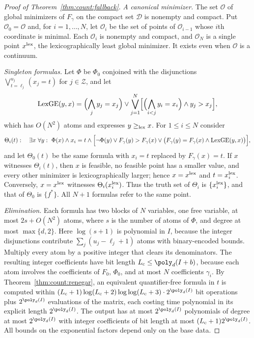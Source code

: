 \begin{proof}[Proof of Theorem~\ref{thm:count:fallback}]
\emph{A canonical minimizer.} The set $\mathcal O$ of global minimizers of
$F_\gamma$ on the compact set $\mathcal D$ is nonempty and compact. Put
$\mathcal O_0=\mathcal O$ and, for $i=1,\dots,N$, let $\mathcal O_i$ be the set
of points of $\mathcal O_{i-1}$ whose $i$th coordinate is minimal. Each
$\mathcal O_i$ is nonempty and compact, and $\mathcal O_N$ is a single point
$x^{\rm lex}$, the lexicographically least global minimizer. It exists even
when $\mathcal O$ is a continuum.

\emph{Singleton formulas.} Let $\Phi$ be $\Phi_0$ conjoined with the
disjunctions $\bigvee_{t=\ell_j}^{u_j}(x_j=t)$ for $j\in\mathcal Z$, and let
\[
 \operatorname{LexGE}(y,x)=\Bigl(\bigwedge_{j}y_j=x_j\Bigr)\vee
 \bigvee_{j=1}^N\Bigl[\Bigl(\bigwedge_{i<j}y_i=x_i\Bigr)\wedge y_j>x_j\Bigr],
\]
which has $O(N^2)$ atoms and expresses $y\ge_{\rm lex}x$. For $1\le i\le N$
consider
\[
 \Theta_i(t):\quad
 \exists x\ \forall y:\ \Phi(x)\wedge x_i=t\wedge
 \Bigl[\neg\Phi(y)\vee F_\gamma(y)>F_\gamma(x)\vee
 \bigl(F_\gamma(y)=F_\gamma(x)\wedge\operatorname{LexGE}(y,x)\bigr)\Bigr],
\]
and let $\Theta_0(t)$ be the same formula with $x_i=t$ replaced by
$F_\gamma(x)=t$. If $x$ witnesses $\Theta_i(t)$, then $x$ is feasible, no
feasible point has a smaller value, and every other minimizer is
lexicographically larger; hence $x=x^{\rm lex}$ and $t=x^{\rm lex}_i$.
Conversely, $x=x^{\rm lex}$ witnesses $\Theta_i(x_i^{\rm lex})$. Thus the truth
set of $\Theta_i$ is $\{x_i^{\rm lex}\}$, and that of $\Theta_0$ is $\{f^*\}$.
All $N+1$ formulas refer to the same point.

\emph{Elimination.} Each formula has two blocks of $N$ variables, one free
variable, at most $2s+O(N^2)$ atoms, where $s$ is the number of atoms of
$\Phi$, and degree at most $\max\{d,2\}$. Here $\log(s+1)$ is polynomial in
$I$, because the integer disjunctions contribute $\sum_j(u_j-\ell_j+1)$ atoms
with binary-encoded bounds. Multiply every atom by a positive integer that
clears its denominators. The resulting integer coefficients have bit length
$L_{\rm c}\le\poly_d(I+b)$, because each atom involves the coefficients of
$F_0$, $\Phi_0$, and at most $N$ coefficients $\gamma_i$. By
Theorem~\ref{thm:count:renegar}, an equivalent quantifier-free formula in $t$
is computed within $(L_{\rm c}+1)\log(L_{\rm c}+2)\log\log(L_{\rm c}+3)\cdot2^{\poly_d(I)}$
bit operations plus $2^{\poly_d(I)}$ evaluations of the matrix, each costing
time polynomial in its explicit length $2^{\poly_d(I)}$. The output has at most
$2^{\poly_d(I)}$ polynomials of degree at most $2^{\poly_d(I)}$ with integer
coefficients of bit length at most $(L_{\rm c}+1)2^{\poly_d(I)}$. All bounds
on the exponential factors depend only on the base data.


\end{proof}
